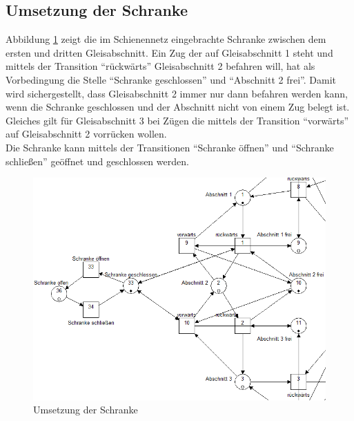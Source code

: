 \documentclass[10pt]{scrartcl}
\begin{document}
\subsection{Umsetzung der Schranke}
Abbildung \ref{fig:Schranke} zeigt die im Schienennetz eingebrachte Schranke zwischen dem ersten und dritten Gleisabschnitt. Ein Zug der auf Gleisabschnitt 1 steht und mittels der Transition "`rückwärts"' Gleisabschnitt 2 befahren will, hat als Vorbedingung die Stelle "`Schranke geschlossen"' und "`Abschnitt 2 frei"'. Damit wird sichergestellt, dass Gleisabschnitt 2 immer nur dann befahren werden kann, wenn die Schranke geschlossen und der Abschnitt nicht von einem Zug belegt ist. Gleiches gilt für Gleisabschnitt 3 bei Zügen die mittels der Transition "`vorwärts"' auf Gleisabschnitt 2 vorrücken wollen.\\
Die Schranke kann mittels der Transitionen "`Schranke öffnen"' und "`Schranke schließen"' geöffnet und geschlossen werden.
 
\begin{figure}[htbp]
	\centering	\includegraphics[width=1.0\textwidth]{Bilder/Aufgabe2_Schranke.png}
	\caption{Umsetzung der Schranke}
	\label{fig:Schranke}
\end{figure}
\end{document}
